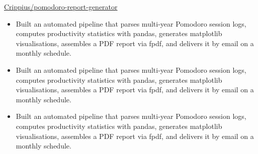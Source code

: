  {}
{
}
{\href{https://github.com/Crippius/pomodoro-report-generator}
{Crippius/pomodoro-report-generator}}
\begin{itemize}

    \ifde
        \item Built an automated pipeline that parses multi-year Pomodoro session logs, computes productivity statistics with pandas, generates matplotlib visualisations, assembles a PDF report via fpdf, and delivers it by email on a monthly schedule.
    \else
        \ifhpc
            \item Built an automated pipeline that parses multi-year Pomodoro session logs, computes productivity statistics with pandas, generates matplotlib visualisations, assembles a PDF report via fpdf, and delivers it by email on a monthly schedule.
        \else
            \item Built an automated pipeline that parses multi-year Pomodoro session logs, computes productivity statistics with pandas, generates matplotlib visualisations, assembles a PDF report via fpdf, and delivers it by email on a monthly schedule.
        \fi
    \fi

\end{itemize}

\medskip
